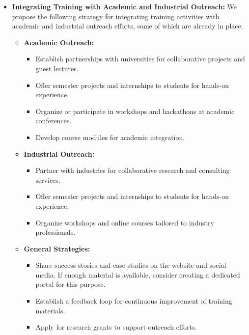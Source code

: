 \begin{itemize}
    \item \textbf{Integrating Training with Academic and Industrial Outreach:}
        We propose the following strategy for integrating training activities with academic and industrial outreach efforts, some of which are already in place:
    \begin{itemize}
        \item \textbf{Academic Outreach:}
        \begin{itemize}
            \item Establish partnerships with universities for collaborative projects and guest lectures.
            \item Offer semester projects and internships to students for hands-on experience.
            \item Organize or participate in workshops and hackathons at academic conferences.
            \item Develop course modules for academic integration.
        \end{itemize}
        \item \textbf{Industrial Outreach:}
        \begin{itemize}
            \item Partner with industries for collaborative research and consulting services.
            \item Offer semester projects and internships to students for hands-on experience.
            \item Organize workshops and online courses tailored to industry professionals.
        \end{itemize}
        \item \textbf{General Strategies:}
        \begin{itemize}
            \item Share success stories and case studies on the website and social media. If enough material is available, consider creating a dedicated portal for this purpose.
            \item Establish a feedback loop for continuous improvement of training materials.
            \item Apply for research grants to support outreach efforts.
        \end{itemize}
    \end{itemize}
\end{itemize}
